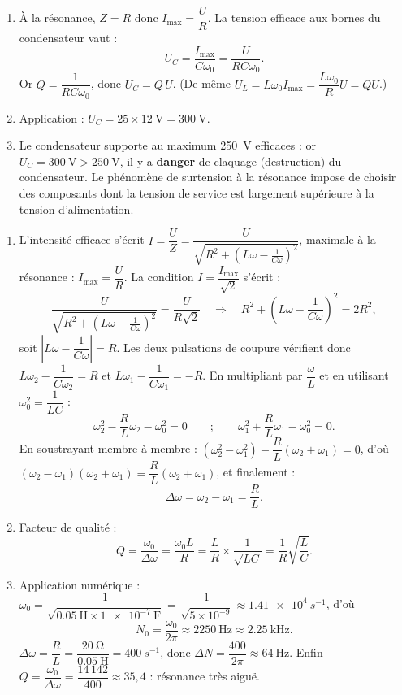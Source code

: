\documentclass[11pt]{article}
\begin{document}
\begin{corrige}
\begin{enumerate}
\item À la résonance, $Z = R$ donc $I_{\max} = \dfrac{U}{R}$. La tension efficace aux bornes du condensateur vaut :
\[ U_C = \dfrac{I_{\max}}{C\omega_0} = \dfrac{U}{RC\omega_0}. \]
Or $Q = \dfrac{1}{RC\omega_0}$, donc $\boxed{U_C = Q\,U}$. (De même $U_L = L\omega_0 I_{\max} = \dfrac{L\omega_0}{R}U = QU$.)
\item Application : $U_C = 25 \times \SI{12}{\volt} = \SI{300}{\volt}$.
\item Le condensateur supporte au maximum \SI{250}{\volt} efficaces : or $U_C = \SI{300}{\volt} > \SI{250}{\volt}$, il y a \textbf{danger} de claquage (destruction) du condensateur. Le phénomène de surtension à la résonance impose de choisir des composants dont la tension de service est largement supérieure à la tension d'alimentation.
\end{enumerate}
\end{corrige}

\begin{corrige}
\begin{enumerate}
\item L'intensité efficace s'écrit $I = \dfrac{U}{Z} = \dfrac{U}{\sqrt{R^2 + \left(L\omega - \frac{1}{C\omega}\right)^2}}$, maximale à la résonance : $I_{\max} = \dfrac{U}{R}$. La condition $I = \dfrac{I_{\max}}{\sqrt{2}}$ s'écrit :
\[ \dfrac{U}{\sqrt{R^2 + \left(L\omega - \frac{1}{C\omega}\right)^2}} = \dfrac{U}{R\sqrt{2}} \quad \Rightarrow \quad R^2 + \left(L\omega - \dfrac{1}{C\omega}\right)^2 = 2R^2, \]
soit $\left|L\omega - \dfrac{1}{C\omega}\right| = R$. Les deux pulsations de coupure vérifient donc $L\omega_2 - \dfrac{1}{C\omega_2} = R$ et $L\omega_1 - \dfrac{1}{C\omega_1} = -R$. En multipliant par $\dfrac{\omega}{L}$ et en utilisant $\omega_0^2 = \dfrac{1}{LC}$ :
\[ \omega_2^2 - \dfrac{R}{L}\omega_2 - \omega_0^2 = 0 \qquad ; \qquad \omega_1^2 + \dfrac{R}{L}\omega_1 - \omega_0^2 = 0. \]
En soustrayant membre à membre : $(\omega_2^2 - \omega_1^2) - \dfrac{R}{L}(\omega_2 + \omega_1) = 0$, d'où $(\omega_2 - \omega_1)(\omega_2 + \omega_1) = \dfrac{R}{L}(\omega_2 + \omega_1)$, et finalement :
\[ \boxed{\Delta\omega = \omega_2 - \omega_1 = \dfrac{R}{L}}. \]
\item Facteur de qualité :
\[ Q = \dfrac{\omega_0}{\Delta\omega} = \dfrac{\omega_0 L}{R} = \dfrac{L}{R}\times\dfrac{1}{\sqrt{LC}} = \dfrac{1}{R}\sqrt{\dfrac{L}{C}}. \]
\item Application numérique : $\omega_0 = \dfrac{1}{\sqrt{\SI{0,05}{\henry} \times \SI{1e-7}{\farad}}} = \dfrac{1}{\sqrt{5\times10^{-9}}} \approx \SI{1,41e4}{s^{-1}}$, d'où
\[ N_0 = \dfrac{\omega_0}{2\pi} \approx \SI{2250}{\hertz} \approx \SI{2,25}{\kilo\hertz}. \]
$\Delta\omega = \dfrac{R}{L} = \dfrac{\SI{20}{\ohm}}{\SI{0,05}{\henry}} = \SI{400}{s^{-1}}$, donc $\Delta N = \dfrac{400}{2\pi} \approx \SI{64}{\hertz}$. Enfin $Q = \dfrac{\omega_0}{\Delta\omega} = \dfrac{14\,142}{400} \approx 35{,}4$ : résonance très aiguë.
\end{enumerate}
\end{corrige}
\end{document}
